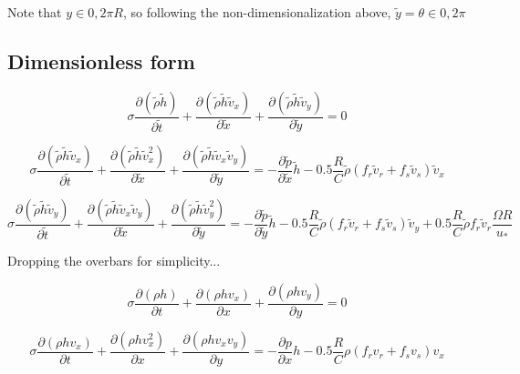 \documentclass[12pt,letterpaper]{article}
\newcommand*{\nd}[1]{\tilde{#1}} %
\begin{document}
Note that $y \in 0,2 \pi R$, so following the non-dimensionalization
above, $\nd{y} = \theta \in 0,2 \pi$


\subsection{Dimensionless form}

\begin{dmath*}
\sigma \frac{\partial \left( \nd{\rho} \nd{h} \right)}{\partial \nd{t}} +
\frac{\partial \left( \nd{\rho} \nd{h} \nd{v}_x \right)}{\partial \nd{x}} +
\frac{\partial \left( \nd{\rho} \nd{h} \nd{v}_y \right)}{\partial \nd{y}}
 = 0
\end{dmath*}


\begin{dmath*}
\sigma \frac{\partial \left( \nd{\rho} \nd{h} \nd{v}_x \right)}{\partial \nd{t}} +
\frac{\partial \left( \nd{\rho} \nd{h} \nd{v}_x^2 \right)}{\partial \nd{x}} +
\frac{\partial \left( \nd{\rho} \nd{h} \nd{v}_x \nd{v}_y \right)}{\partial \nd{y}} =
- \frac{\partial \nd{p} }{\partial \nd{x} } \nd{h} - 
0.5 \frac{R}{C} \nd{\rho} \left( f_r \nd{v}_r + f_s \nd{v}_s \right) \nd{v}_x
\end{dmath*}


\begin{dmath*}
\sigma \frac{\partial \left( \nd{\rho} \nd{h} \nd{v}_y \right)}{\partial \nd{t}} +
\frac{\partial \left( \nd{\rho} \nd{h} \nd{v}_x \nd{v}_y \right)}{\partial \nd{x}} +
\frac{\partial \left( \nd{\rho} \nd{h} \nd{v}_y^2 \right)}{\partial \nd{y}} =
- \frac{\partial \nd{p} }{\partial \nd{y} } \nd{h} - 
0.5 \frac{R}{C} \nd{\rho} \left( f_r \nd{v}_r + f_s \nd{v}_s \right) \nd{v}_y +
0.5 \frac{R}{C} \nd{\rho} f_r \nd{v}_r \frac{ \Omega R}{u_*}
\end{dmath*}


Dropping the overbars for simplicity...


\begin{dmath}
\sigma \frac{\partial \left( \rho h \right)}{\partial t} +
\frac{\partial \left( \rho h v_x \right)}{\partial x} +
\frac{\partial \left( \rho h v_y \right)}{\partial y}
 = 0
\end{dmath}



\begin{dmath}
\sigma \frac{\partial \left( \rho h v_x \right)}{\partial t} +
\frac{\partial \left( \rho h v_x^2 \right)}{\partial x} +
\frac{\partial \left( \rho h v_x v_y \right)}{\partial y} =
- \frac{\partial p }{\partial x } h - 
0.5 \frac{R}{C} \rho \left( f_r v_r + f_s v_s \right) v_x
\end{dmath}
\end{document}
